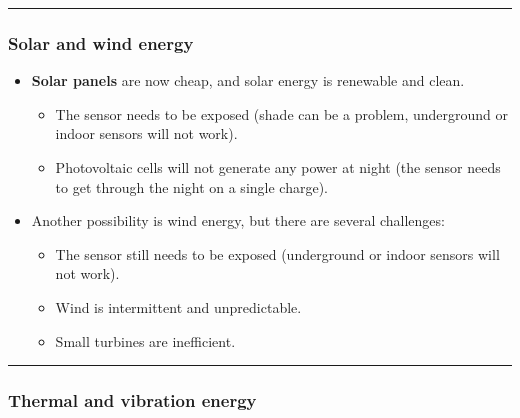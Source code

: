 \documentclass[
]{article}
\providecommand{\tightlist}{%
  \setlength{\itemsep}{0pt}\setlength{\parskip}{0pt}}
\begin{document}
\begin{center}\rule{0.5\linewidth}{0.5pt}\end{center}

\subsubsection{Solar and wind energy}\label{solar-and-wind-energy}

\begin{itemize}
\tightlist
\item
  \textbf{Solar panels} are now cheap, and solar energy is renewable and
  clean.

  \begin{itemize}
  \tightlist
  \item
    The sensor needs to be exposed (shade can be a problem, underground
    or indoor sensors will not work).
  \item
    Photovoltaic cells will not generate any power at night (the sensor
    needs to get through the night on a single charge).
  \end{itemize}
\item
  Another possibility is wind energy, but there are several challenges:

  \begin{itemize}
  \tightlist
  \item
    The sensor still needs to be exposed (underground or indoor sensors
    will not work).
  \item
    Wind is intermittent and unpredictable.
  \item
    Small turbines are inefficient.
  \end{itemize}
\end{itemize}

\begin{center}\rule{0.5\linewidth}{0.5pt}\end{center}

\subsubsection{Thermal and vibration
energy}\label{thermal-and-vibration-energy}
\end{document}
